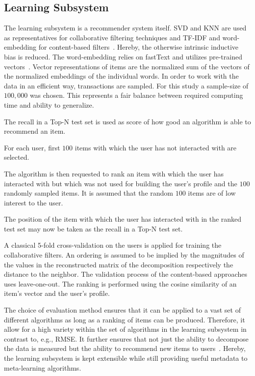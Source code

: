 \documentclass[runningheads]{llncs}
\begin{document}
\subsection{Learning Subsystem}
The learning subsystem is a recommender system itself. SVD and KNN are used as representatives for collaborative filtering techniques and TF-IDF and word-embedding for content-based filters~\cite{scikit-learn,rehurek_lrec}. Hereby, the otherwise intrinsic inductive bias is reduced. The word-embedding relies on fastText and utilizes pre-trained vectors~\cite{DBLP:journals/corr/BojanowskiGJM16}. Vector representations of items are the normalized sum of the vectors of the normalized embeddings of the individual words. In order to work with the data in an efficient way, transactions are sampled. For this study a sample-size of $100,000$ was chosen. This represents a fair balance between required computing time and ability to generalize.

The recall in a Top-N test set is used as score of how good an algorithm is able to recommend an item.
\begin{enumerate*}[label= (\arabic*)]
	\item For each user, first $100$ items with which the user has not interacted with are selected.
	\item The algorithm is then requested to rank an item with which the user has interacted with but which was not used for building the user's profile and the $100$ randomly sampled items. It is assumed that the random $100$ items are of low interest to the user.
	\item The position of the item with which the user has interacted with in the ranked test set may now be taken as the recall in a Top-N test set.
\end{enumerate*}

A classical 5-fold cross-validation on the users is applied for training the collaborative filters.  An ordering is assumed to be implied by the magnitudes of the values in the reconstructed matrix of the decomposition respectively the distance to the neighbor. The validation process of the content-based approaches uses leave-one-out. The ranking is performed using the cosine similarity of an item's vector and the user's profile.

The choice of evaluation method ensures that it can be applied to a vast set of different algorithms as long as a ranking of items can be produced. Therefore, it allow for a high variety within the set of algorithms in the learning subsystem in contrast to, e.g., RMSE. It further ensures that not just the ability to decompose the data is measured but the ability to recommend new items to users~\cite{Cremonesi:2010:PRA:1864708.1864721}. Hereby, the learning subsystem is kept extensible while still providing useful metadata to meta-learning algorithms.
\end{document}
